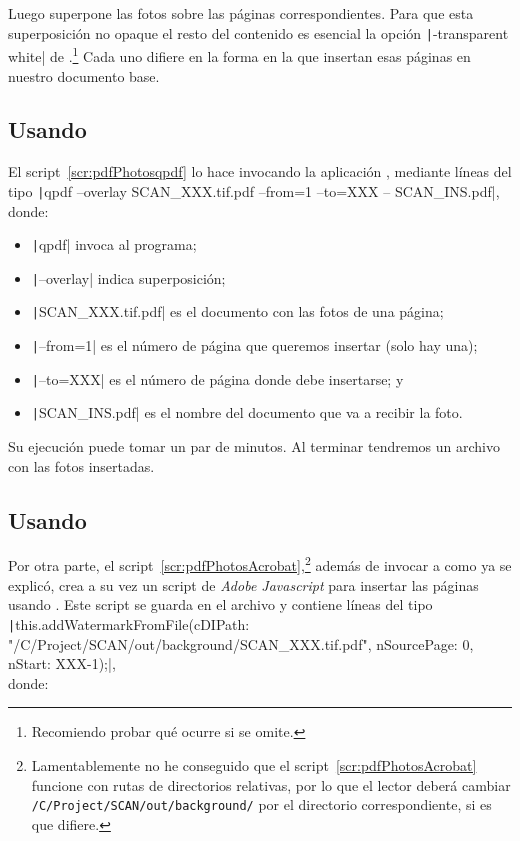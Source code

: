 \documentclass[%
	a5paper,
	10pt,
	twoside,
	openright,
	final,
]{memoir}
\begin{document}
{	Luego superpone las fotos sobre las páginas correspondientes. Para que esta superposición no opaque el resto del contenido es esencial la opción \texttt|-transparent white| de \imagemagick.\footnote{Recomiendo probar qué ocurre si se omite.} Cada uno difiere en la forma en la que insertan esas páginas en nuestro documento base.

	\subsection{Usando \texorpdfstring{\qpdf}{QPDF}\label{sec:pdfPhotosqpdf}} El script~\ref{scr:pdfPhotosqpdf} lo hace invocando la aplicación \qpdf, mediante líneas del tipo \texttt|qpdf --overlay SCAN_XXX.tif.pdf --from=1 --to=XXX -- SCAN_INS.pdf|, donde:

	\begin{itemize}[noitemsep]
		\item \texttt|qpdf| invoca al programa;
		\item \texttt|--overlay| indica superposición;
		\item \texttt|SCAN_XXX.tif.pdf| es el documento con las fotos de una página;
		\item \texttt|--from=1| es el número de página que queremos insertar (solo hay una);
		\item \texttt|--to=XXX| es el número de página donde debe insertarse; y
		\item \texttt|SCAN_INS.pdf| es el nombre del documento que va a recibir la foto.
	\end{itemize}


	Su ejecución puede tomar un par de minutos. Al terminar tendremos un archivo  con las fotos insertadas.

	\subsection{Usando \acrobat\label{sec:pdfPhotosAcrobat}} Por otra parte, el script~\ref{scr:pdfPhotosAcrobat},\footnote{Lamentablemente no he conseguido que el script~\ref{scr:pdfPhotosAcrobat} funcione con rutas de directorios relativas, por lo que el lector deberá cambiar \texttt{/C/Project/SCAN/out/background/} por el directorio correspondiente, si es que difiere.} además de invocar a \imagemagick como ya se explicó, crea a su vez un script de \emph{Adobe Javascript} para insertar las páginas usando \acrobat \cite{AdobeJavaScriptGuide, AdobeJavaScriptReference}. Este script se guarda en el archivo  y contiene líneas del tipo \texttt|this.addWatermarkFromFile({cDIPath: "/C/Project/SCAN/out/background/SCAN_XXX.tif.pdf", nSourcePage: 0, nStart: XXX-1});|,\\donde:

}
\end{document}
